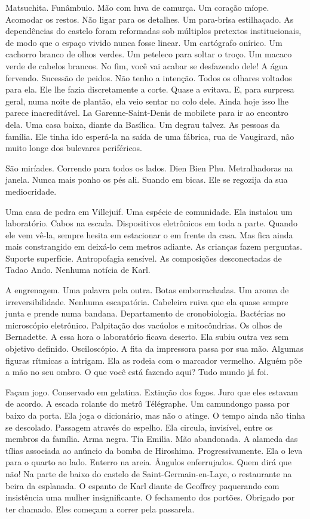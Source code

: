Matsuchita. Funâmbulo. Mão com luva de camurça. Um coração míope.
Acomodar os restos. Não ligar para os detalhes. Um para-brisa
estilhaçado. As dependências do castelo foram reformadas sob múltiplos
pretextos institucionais, de modo que o espaço vivido nunca fosse
linear. Um cartógrafo onírico. Um cachorro branco de olhos verdes. Um
peteleco para soltar o troço. Um macaco verde de cabelos brancos. No
fim, você vai acabar se desfazendo dele! A água fervendo. Sucessão de
peidos. Não tenho a intenção. Todos os olhares voltados para ela. Ele
lhe fazia discretamente a corte. Quase a evitava. E, para surpresa
geral, numa noite de plantão, ela veio sentar no colo dele. Ainda hoje
isso lhe parece inacreditável. La Garenne-Saint-Denis de mobilete para
ir ao encontro dela. Uma casa baixa, diante da Basílica. Um degrau
talvez. As pessoas da família. Ele tinha ido esperá-la na saída de uma
fábrica, rua de Vaugirard, não muito longe dos bulevares periféricos.

São miríades. Correndo para todos os lados. Dien Bien Phu. Metralhadoras
na janela. Nunca mais ponho os pés ali. Suando em bicas. Ele se regozija
da sua mediocridade.

Uma casa de pedra em Villejuif. Uma espécie de comunidade. Ela instalou
um laboratório. Cabos na escada. Dispositivos eletrônicos em toda a
parte. Quando ele vem vê-la, sempre hesita em estacionar o  em frente
da casa. Mas fica ainda mais constrangido em deixá-lo cem metros
adiante. As crianças fazem perguntas. Suporte superfície. Antropofagia
sensível. As composições desconectadas de Tadao Ando. Nenhuma notícia de
Karl.

A engrenagem. Uma palavra pela outra. Botas emborrachadas. Um aroma de
irreversibilidade. Nenhuma escapatória. Cabeleira ruiva que ela quase
sempre junta e prende numa bandana. Departamento de cronobiologia.
Bactérias no microscópio eletrônico. Palpitação dos vacúolos e
mitocôndrias. Os olhos de Bernadette. A essa hora o laboratório ficava
deserto. Ela subiu outra vez sem objetivo definido. Osciloscópio. A fita
da impressora passa por sua mão. Algumas figuras rítmicas a intrigam.
Ela as rodeia com o marcador vermelho. Alguém põe a mão no seu ombro. O
que você está fazendo aqui? Tudo mundo já foi.

Façam jogo. Conservado em gelatina. Extinção dos fogos. Juro que eles
estavam de acordo. A escada rolante do metrô Télégraphe. Um camundongo
passa por baixo da porta. Ela joga o dicionário, mas não o atinge. O
tempo ainda não tinha se descolado. Passagem através do espelho. Ela
circula, invisível, entre os membros da família. Arma negra. Tia Emilia.
Mão abandonada. A alameda das tílias associada ao anúncio da bomba de
Hiroshima. Progressivamente. Ela o leva para o quarto ao lado. Enterro
na areia. Ângulos enferrujados. Quem dirá que não! Na parte de baixo do
castelo de Saint-Germain-en-Laye, o restaurante na beira da esplanada. O
espanto de Karl diante de Geoffrey paquerando com insistência uma mulher
insignificante. O fechamento dos portões. Obrigado por ter chamado. Eles
começam a correr pela passarela.

